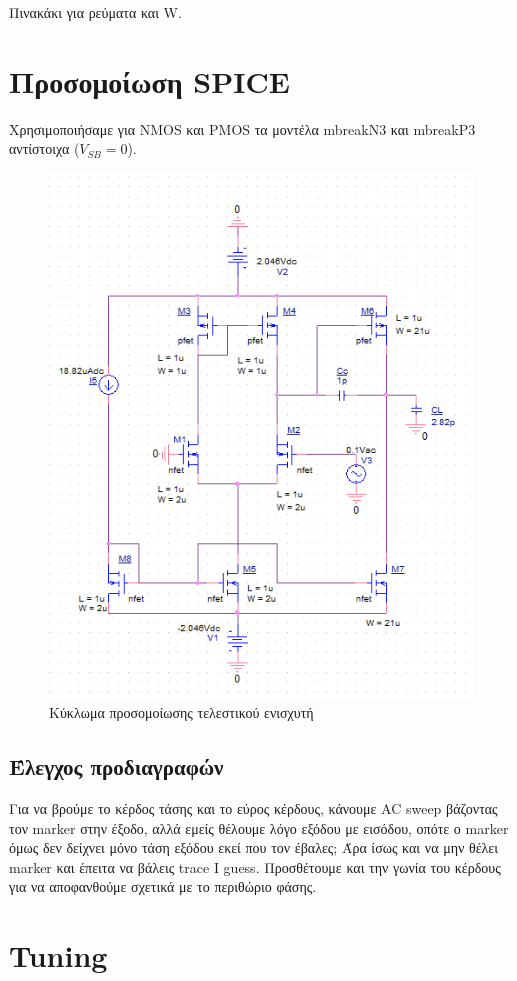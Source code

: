 \documentclass[12pt, a4paper]{article}
\begin{document}
Πινακάκι για ρεύματα και W.

\section{Προσομοίωση SPICE}

Χρησιμοποιήσαμε για NMOS και PMOS τα μοντέλα mbreakN3 και mbreakP3 αντίστοιχα ($V_{SB} = 0$).

\begin{figure}[h!]
	\centering
	\includegraphics[width = \textwidth, height = .4\textheight, keepaspectratio]{assets/base.png}
	\caption{Κύκλωμα προσομοίωσης τελεστικού ενισχυτή}
\end{figure}

\subsection{Έλεγχος προδιαγραφών}

Για να βρούμε το κέρδος τάσης και το εύρος κέρδους, κάνουμε AC sweep βάζοντας τον marker στην έξοδο, αλλά εμείς θέλουμε λόγο εξόδου με εισόδου, οπότε ο marker όμως δεν δείχνει μόνο τάση εξόδου εκεί που τον έβαλες; Άρα ίσως και να μην θέλει marker και έπειτα να βάλεις trace Ι guess. Προσθέτουμε και την γωνία του κέρδους για να αποφανθούμε σχετικά με το περιθώριο φάσης.


\section{Tuning}
\end{document}
